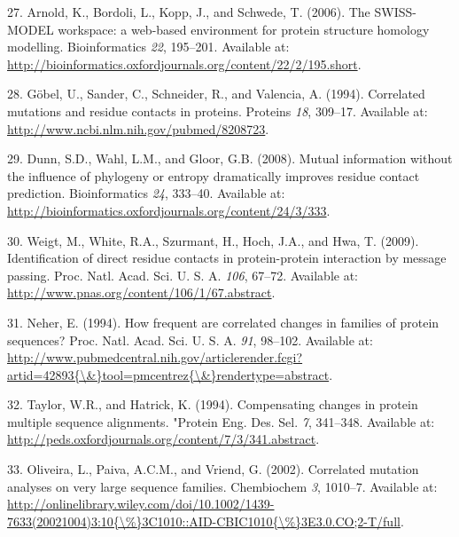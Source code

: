 \documentclass[12pt,a4paper,twoside]{book}
\theoremstyle{definition}
\theoremstyle{definition}
\theoremstyle{remark}
\begin{document}
\hypertarget{ref-Arnold2006}{}
27. Arnold, K., Bordoli, L., Kopp, J., and Schwede, T. (2006). The
SWISS-MODEL workspace: a web-based environment for protein structure
homology modelling. Bioinformatics \emph{22}, 195--201. Available at:
\url{http://bioinformatics.oxfordjournals.org/content/22/2/195.short}.

\hypertarget{ref-Gobel1994}{}
28. Göbel, U., Sander, C., Schneider, R., and Valencia, A. (1994).
Correlated mutations and residue contacts in proteins. Proteins
\emph{18}, 309--17. Available at:
\url{http://www.ncbi.nlm.nih.gov/pubmed/8208723}.

\hypertarget{ref-Dunn2008}{}
29. Dunn, S.D., Wahl, L.M., and Gloor, G.B. (2008). Mutual information
without the influence of phylogeny or entropy dramatically improves
residue contact prediction. Bioinformatics \emph{24}, 333--40. Available
at: \url{http://bioinformatics.oxfordjournals.org/content/24/3/333}.

\hypertarget{ref-Weigt2009}{}
30. Weigt, M., White, R.A., Szurmant, H., Hoch, J.A., and Hwa, T.
(2009). Identification of direct residue contacts in protein-protein
interaction by message passing. Proc. Natl. Acad. Sci. U. S. A.
\emph{106}, 67--72. Available at:
\url{http://www.pnas.org/content/106/1/67.abstract}.

\hypertarget{ref-Neher1994}{}
31. Neher, E. (1994). How frequent are correlated changes in families of
protein sequences? Proc. Natl. Acad. Sci. U. S. A. \emph{91}, 98--102.
Available at:
\href{http://www.pubmedcentral.nih.gov/articlerender.fcgi?artid=42893\%7B/\&\%7Dtool=pmcentrez\%7B/\&\%7Drendertype=abstract}{http://www.pubmedcentral.nih.gov/articlerender.fcgi?artid=42893\{\textbackslash{}\&\}tool=pmcentrez\{\textbackslash{}\&\}rendertype=abstract}.

\hypertarget{ref-Taylor1994}{}
32. Taylor, W.R., and Hatrick, K. (1994). Compensating changes in
protein multiple sequence alignments. "Protein Eng. Des. Sel. \emph{7},
341--348. Available at:
\url{http://peds.oxfordjournals.org/content/7/3/341.abstract}.

\hypertarget{ref-Oliveira2002}{}
33. Oliveira, L., Paiva, A.C.M., and Vriend, G. (2002). Correlated
mutation analyses on very large sequence families. Chembiochem \emph{3},
1010--7. Available at:
\href{http://onlinelibrary.wiley.com/doi/10.1002/1439-7633(20021004)3:10\%7B/\%\%7D3C1010::AID-CBIC1010\%7B/\%\%7D3E3.0.CO;2-T/full}{http://onlinelibrary.wiley.com/doi/10.1002/1439-7633(20021004)3:10\{\textbackslash{}\%\}3C1010::AID-CBIC1010\{\textbackslash{}\%\}3E3.0.CO;2-T/full}.
\end{document}
